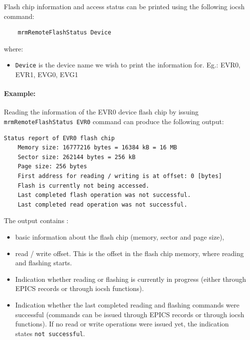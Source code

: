 \documentclass[12pt,a4paper]{article}
\begin{document}
Flash chip information and access status can be printed using the following iocsh command:
\begin{verbatim}
	mrmRemoteFlashStatus Device
\end{verbatim}
where:
\begin{itemize}
	\item \texttt{Device} is the device name we wish to print the information for. Eg.: EVR0, EVR1, EVG0, EVG1
\end{itemize}

\paragraph{Example:} Reading the information of the EVR0 device flash chip by issuing \texttt{mrmRemoteFlashStatus EVR0} command can produce the following output:
\begin{verbatim}
Status report of EVR0 flash chip
    Memory size: 16777216 bytes = 16384 kB = 16 MB
    Sector size: 262144 bytes = 256 kB
    Page size: 256 bytes
    First address for reading / writing is at offset: 0 [bytes]
    Flash is currently not being accessed.
    Last completed flash operation was not successful.
    Last completed read operation was not successful.
\end{verbatim}
The output contains :
\begin{itemize}
	\item basic information about the flash chip (memory, sector and page size),
	\item read / write offset. This is the offset in the flash chip memory, where reading and flashing starts.
	\item Indication whether reading or flashing is currently in progress (either through EPICS records or through iocsh functions).
	\item Indication whether the last completed reading and flashing commands were successful (commands can be issued through EPICS records or through iocsh functions). If no read or write operations were issued yet, the indication states \texttt{not successful}.
\end{itemize}
\end{document}
